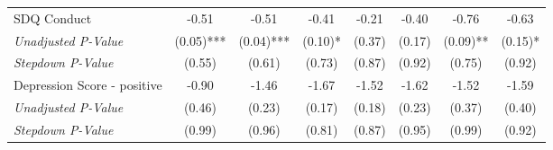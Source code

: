 \begin{tabular}{l c c c c c c c}
SDQ Conduct & -0.51 & -0.51 & -0.41 & -0.21 & -0.40 & -0.76 & -0.63 \\
\quad \textit{Unadjusted P-Value} & (0.05)*** & (0.04)*** & (0.10)* & (0.37) & (0.17) & (0.09)** & (0.15)* \\
\quad \textit{Stepdown P-Value} & (0.55) & (0.61) & (0.73) & (0.87) & (0.92) & (0.75) & (0.92) \\
Depression Score - positive & -0.90 & -1.46 & -1.67 & -1.52 & -1.62 & -1.52 & -1.59 \\
\quad \textit{Unadjusted P-Value} & (0.46) & (0.23) & (0.17) & (0.18) & (0.23) & (0.37) & (0.40) \\
\quad \textit{Stepdown P-Value} & (0.99) & (0.96) & (0.81) & (0.87) & (0.95) & (0.99) & (0.92) \\
\bottomrule
\end{tabular}
